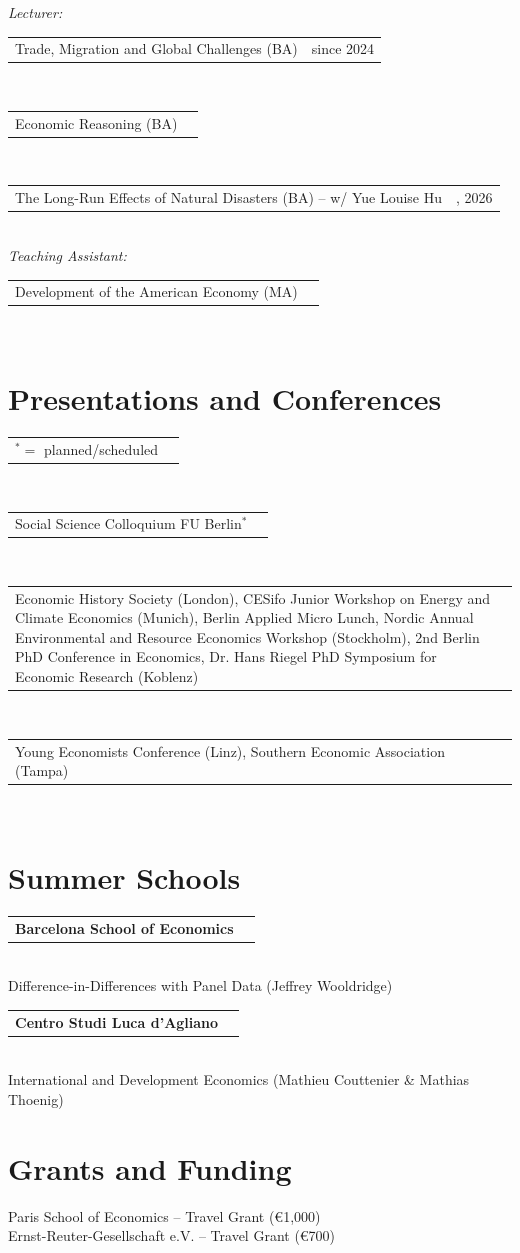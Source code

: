 \documentclass[10pt,a4paper]{article}
\makeatletter
\newlength{\datecolwidth}
\newlength{\contentcolwidth}
\newcommand{\cvitem}[2]{%
  \begin{tabular}{@{} p{\contentcolwidth} >{\raggedleft\arraybackslash}p{\datecolwidth} @{}}
    #2 & #1
  \end{tabular}\\[0.05em]
}
\makeatother
\begin{document}
\textit{Lecturer:} \\[0.1em]
\cvitem{since 2024}{Trade, Migration and Global Challenges (BA)}
\cvitem{2027}{Economic Reasoning (BA)}
\cvitem{2025, 2026}{The Long-Run Effects of Natural Disasters (BA) -- w/ Yue Louise Hu}
\textit{Teaching Assistant:} \\[0.1em]
\cvitem{2024}{Development of the American Economy (MA)}

\section{\large Presentations and Conferences}
\cvitem{}{\footnotesize $^*=$ planned/scheduled}
\cvitem{2027}{Social Science Colloquium FU Berlin$^*$}
\cvitem{2026}{Economic History Society (London), CESifo Junior Workshop on Energy and Climate Economics (Munich), Berlin Applied Micro Lunch, Nordic Annual Environmental and Resource Economics Workshop (Stockholm), 2nd Berlin PhD Conference in Economics, Dr. Hans Riegel PhD Symposium for Economic Research (Koblenz)}

\cvitem{2025}{Young Economists Conference (Linz), Southern Economic Association (Tampa)} 

\section{\large Summer Schools}

\cvitem{2025}{\textbf{Barcelona School of Economics}}
Difference-in-Differences with Panel Data (Jeffrey Wooldridge) \\[0.15cm]
\cvitem{2025}{\textbf{Centro Studi Luca d'Agliano}}
International and Development Economics (Mathieu Couttenier \& Mathias Thoenig) \\[0.1cm]

\section{\large Grants and Funding}

Paris School of Economics -- Travel Grant (€1,000) \\
Ernst-Reuter-Gesellschaft e.V. -- Travel Grant (€700) \\

\end{document}
